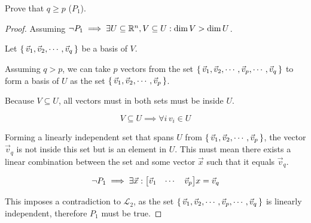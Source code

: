 \begin{question}
	Prove that $q \ge p$ ($P_1$).

	\begin{proof}

		Assuming $\neg P_1 \implies \exists U \subseteq {\mathbb R}^n, V \subseteq U : \dim V > \dim U$.


		Let $\set{ \vec v_1, \vec v_2, \cdots, \vec v_q }$ be a basis of $V$.


		Assuming $q>p$, we can take $p$ vectors from the set $\set{\vec v_1, \vec v_2, \cdots, \vec v_p, \cdots, \vec v_q}$  to form a basis of $U$ as the set $\set{\vec v_1, \vec v_2, \cdots, \vec v_p}$.

		Because $V \subseteq U$, all vectors must in both sets must be inside $U$.

		$$V \subseteq U \implies \forall i\, v_i \in U$$

		Forming a linearly independent set that spans $U$ from $\set{\vec v_1, \vec v_2, \cdots, \vec v_p}$, the vector $\vec v_q$ is not inside this set but is an element in $U$. This must mean there
		exists a linear combination between the set and some vector $\vec x$ such that it equals $\vec v_q$.

		$$ \neg P_1 \implies \exists \vec x : { \begin{bmatrix} \vec v_1 & \cdots & \vec v_p \end{bmatrix} }x = \vec v_q $$

		This imposes a contradiction to $\mathcal L_2$, as the set $\set{\vec v_1, \vec v_2, \cdots, \vec v_p, \cdots, \vec v_q}$ is linearly independent, therefore $P_1$ must be true.
	\end{proof}
\end{question}
